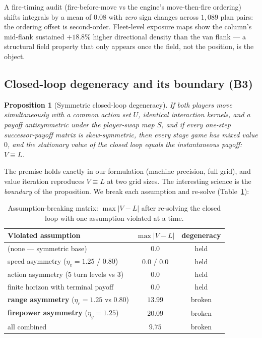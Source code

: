 \documentclass[12pt,a4paper]{article}
\newtheorem{proposition}{Proposition}
\newcommand{\etav}{\eta_v}
\newcommand{\etar}{\eta_r}
\newcommand{\etag}{\eta_g}
\begin{document}
A fire-timing audit (fire-before-move vs the engine's move-then-fire
ordering) shifts integrals by a mean of $0.08$ with \emph{zero} sign changes
across $1{,}089$ plan pairs: the ordering offset is second-order.
Fleet-level exposure maps show the column's mid-flank sustained
$+18.8\%$ higher directional density than the van flank --- a structural
field property that only appears once the field, not the position, is the
object.

\subsection{Closed-loop degeneracy and its boundary (B3)}\label{sec:degeneracy}

\begin{proposition}[Symmetric closed-loop degeneracy]\label{prop:deg}
If both players move simultaneously with a common action set $U$, identical
interaction kernels, and a payoff antisymmetric under the player-swap map
$S$, and if every one-step successor-payoff matrix is skew-symmetric, then
every stage game has mixed value $0$, and the stationary value of the
closed loop equals the instantaneous payoff: $V\equiv L$.
\end{proposition}

The premise holds exactly in our formulation (machine precision, full
grid), and value iteration reproduces $V\equiv L$ at two grid sizes.
The interesting science is the \emph{boundary} of the proposition.  We
break each assumption and re-solve (Table~\ref{tab:b3}):

\begin{table}[!htb]
\centering\small
\caption{Assumption-breaking matrix: $\max|V-L|$ after re-solving the
closed loop with one assumption violated at a time.}
\label{tab:b3}
\begin{tabular}{lcc}
\toprule
Violated assumption & $\max|V-L|$ & degeneracy \\
\midrule
(none --- symmetric base) & $0.0$ & held \\
speed asymmetry ($\etav=1.25$ / $0.80$) & $0.0$ / $0.0$ & held \\
action asymmetry (5 turn levels vs 3) & $0.0$ & held \\
finite horizon with terminal payoff & $0.0$ & held \\
\textbf{range asymmetry} ($\etar=1.25$ vs $0.80$) & $\mathbf{13.99}$ & broken \\
\textbf{firepower asymmetry} ($\etag=1.25$) & $\mathbf{20.09}$ & broken \\
all combined & $9.75$ & broken \\
\bottomrule
\end{tabular}
\end{table}
\end{document}
